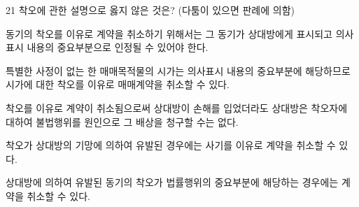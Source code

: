 \begin{question}{21}
착오에 관한 설명으로 옳지 않은 것은? (다툼이 있으면 판례에 의함)
\begin{choices}
  \item 동기의 착오를 이유로 계약을 취소하기 위해서는 그 동기가 상대방에게 표시되고 의사표시 내용의 중요부분으로 인정될 수 있어야 한다.
  \item 특별한 사정이 없는 한 매매목적물의 시가는 의사표시 내용의 중요부분에 해당하므로 시가에 대한 착오를 이유로 매매계약을 취소할 수 있다.
  \item 착오를 이유로 계약이 취소됨으로써 상대방이 손해를 입었더라도 상대방은 착오자에 대하여 불법행위를 원인으로 그 배상을 청구할 수는 없다.
  \item 착오가 상대방의 기망에 의하여 유발된 경우에는 사기를 이유로 계약을 취소할 수 있다.
  \item 상대방에 의하여 유발된 동기의 착오가 법률행위의 중요부분에 해당하는 경우에는 계약을 취소할 수 있다.
\end{choices}
\end{question}
